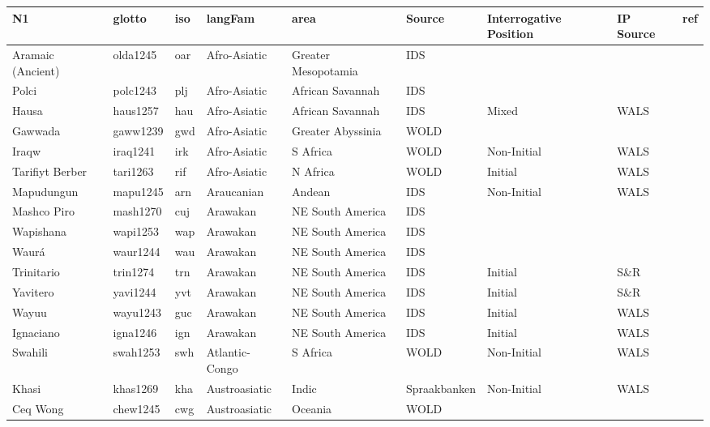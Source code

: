 \centering
\begin{longtable}{lllllllll}
  \hline
N1 & glotto & iso & langFam & area & Source & Interrogative Position & IP Source & ref \\ 
  \hline
Aramaic (Ancient) & olda1245 & oar & Afro-Asiatic & Greater Mesopotamia & IDS &  &  &  \\ 
  Polci & polc1243 & plj & Afro-Asiatic & African Savannah & IDS &  &  &  \\ 
  Hausa & haus1257 & hau & Afro-Asiatic & African Savannah & IDS & Mixed & WALS &  \\ 
  Gawwada & gaww1239 & gwd & Afro-Asiatic & Greater Abyssinia & WOLD &  &  &  \\ 
  Iraqw & iraq1241 & irk & Afro-Asiatic & S Africa & WOLD & Non-Initial & WALS &  \\ 
  Tarifiyt Berber & tari1263 & rif & Afro-Asiatic & N Africa & WOLD & Initial & WALS &  \\ 
  Mapudungun & mapu1245 & arn & Araucanian & Andean & IDS & Non-Initial & WALS &  \\ 
  Mashco Piro & mash1270 & cuj & Arawakan & NE South America & IDS &  &  &  \\ 
  Wapishana & wapi1253 & wap & Arawakan & NE South America & IDS &  &  &  \\ 
  Waurá & waur1244 & wau & Arawakan & NE South America & IDS &  &  &  \\ 
  Trinitario & trin1274 & trn & Arawakan & NE South America & IDS & Initial & S\&R & \cite[91]{rose_trinitario2014.pdf} \\ 
  Yavitero & yavi1244 & yvt & Arawakan & NE South America & IDS & Initial & S\&R & \cite[638]{mosonyietal_yavitero2000.pdf}\cite[79...]{mosonyi_yavitero1987.pdf} \\ 
  Wayuu & wayu1243 & guc & Arawakan & NE South America & IDS & Initial & WALS &  \\ 
  Ignaciano & igna1246 & ign & Arawakan & NE South America & IDS & Initial & WALS &  \\ 
  Swahili & swah1253 & swh & Atlantic-Congo & S Africa & WOLD & Non-Initial & WALS &  \\ 
  Khasi & khas1269 & kha & Austroasiatic & Indic & Spraakbanken & Non-Initial & WALS &  \\ 
  Ceq Wong & chew1245 & cwg & Austroasiatic & Oceania & WOLD &  &  &  \\ 

\end{longtable}
